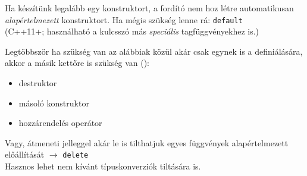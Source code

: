 \documentclass[usenames,dvipsnames,aspectratio=169]{beamer}
\begin{document}
\begin{frame}
    \begin{exampleblock}{}
        \scriptsize
        
        
    \end{exampleblock}
\end{frame}

\begin{frame}
    \begin{exampleblock}{}
        \scriptsize
        
    \end{exampleblock}
    \vfill
    Ha készítünk legalább egy konstruktort, a fordító nem hoz létre automatikusan \emph{alapértelmezett} konstruktort. Ha mégis szükség lenne rá: \texttt{default} \\ (C++11+; használható a kulcsszó más \emph{speciális} tagfüggvényekhez is.)
\end{frame}

\begin{frame}
    Legtöbbször ha szükség van az alábbiak közül akár csak egynek is a definiálására, akkor a másik kettőre is szükség van ():
    \begin{itemize}
        \item destruktor
        \item másoló konstruktor
        \item hozzárendelés operátor
    \end{itemize}
    \vfill
    Vagy, átmeneti jelleggel akár le is tilthatjuk egyes függvények alapértelmezett előállítását $\to$ \texttt{delete}\\
    Hasznos lehet nem kívánt típuskonverziók tiltására is.
\end{frame}

\begin{frame}
    \begin{exampleblock}{}
        \small
        
        
        
        
        
    \end{exampleblock}
\end{frame}
\end{document}
